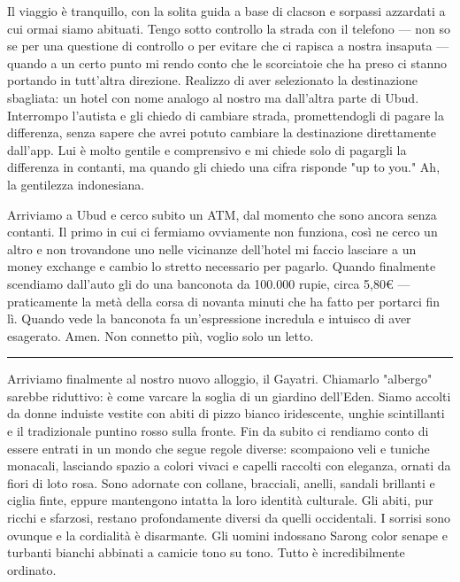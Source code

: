 Il viaggio è tranquillo, con la solita guida a base di clacson e sorpassi azzardati a cui ormai siamo abituati. Tengo sotto controllo la strada con il telefono — non so se per una questione di controllo o per evitare che ci rapisca a nostra insaputa — quando a un certo punto mi rendo conto che le scorciatoie che ha preso ci stanno portando in tutt'altra direzione. Realizzo di aver selezionato la destinazione sbagliata: un hotel con nome analogo al nostro ma dall'altra parte di Ubud. Interrompo l'autista e gli chiedo di cambiare strada, promettendogli di pagare la differenza, senza sapere che avrei potuto cambiare la destinazione direttamente dall'app. Lui è molto gentile e comprensivo e mi chiede solo di pagargli la differenza in contanti, ma quando gli chiedo una cifra risponde "up to you." Ah, la gentilezza indonesiana.

Arriviamo a Ubud e cerco subito un ATM, dal momento che sono ancora senza contanti. Il primo in cui ci fermiamo ovviamente non funziona, così ne cerco un altro e non trovandone uno nelle vicinanze dell'hotel mi faccio lasciare a un money exchange e cambio lo stretto necessario per pagarlo. Quando finalmente scendiamo dall'auto gli do una banconota da 100.000 rupie, circa 5,80€ — praticamente la metà della corsa di novanta minuti che ha fatto per portarci fin lì. Quando vede la banconota fa un'espressione incredula e intuisco di aver esagerato. Amen. Non connetto più, voglio solo un letto.

\begin{center}
    \noindent\rule{0.6\textwidth}{0.4pt}
\end{center}

Arriviamo finalmente al nostro nuovo alloggio, il Gayatri. Chiamarlo "albergo" sarebbe riduttivo: è come varcare la soglia di un giardino dell'Eden. Siamo accolti da donne induiste vestite con abiti di pizzo bianco iridescente, unghie scintillanti e il tradizionale puntino rosso sulla fronte. Fin da subito ci rendiamo conto di essere entrati in un mondo che segue regole diverse: scompaiono veli e tuniche monacali, lasciando spazio a colori vivaci e capelli raccolti con eleganza, ornati da fiori di loto rosa. Sono adornate con collane, bracciali, anelli, sandali brillanti e ciglia finte, eppure mantengono intatta la loro identità culturale. Gli abiti, pur ricchi e sfarzosi, restano profondamente diversi da quelli occidentali. I sorrisi sono ovunque e la cordialità è disarmante. Gli uomini indossano Sarong color senape e turbanti bianchi abbinati a camicie tono su tono. Tutto è incredibilmente ordinato.

